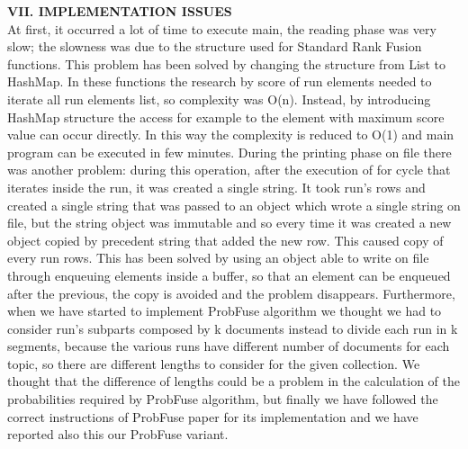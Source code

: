 \documentclass[12pt,journal]{IEEEtran}
\begin{document}
\textbf{VII. IMPLEMENTATION ISSUES} \\
At first, it occurred a lot of time to execute main, the reading phase was very slow; the slowness was due to the structure used for Standard Rank Fusion functions. This problem has been solved by changing the structure from List to HashMap. 
In these functions the research by score of run elements needed to iterate all run elements list, so complexity was O(n). Instead, by introducing HashMap structure the access for example to the element with maximum score value can occur directly. In this way the complexity is reduced to O(1) and main program can be executed in few minutes. 
During the printing phase on file there was another problem: during this operation, after the execution of for cycle that iterates inside the run, it was created a single string. It took run’s rows and created a single string that was passed to an object which wrote a single string on file, but the string object was immutable and so every time it was created a new object copied by precedent string that added the new row. This caused copy of every run rows. This has been solved by using an object able to write on file through enqueuing elements inside a buffer, so that an element can be enqueued after the previous, the copy is avoided and the problem disappears.
Furthermore, when we have started to implement ProbFuse algorithm we thought we had to consider run's subparts composed by k documents instead to divide each run in k segments, because the various runs have different number of documents for each topic, so there are different lengths to consider for the given collection. We thought that the difference of lengths could be a problem in the calculation of the probabilities required by ProbFuse algorithm, but finally we have followed the correct instructions of ProbFuse paper for its implementation and we have reported also this our ProbFuse variant. 
 \\
\end{document}
